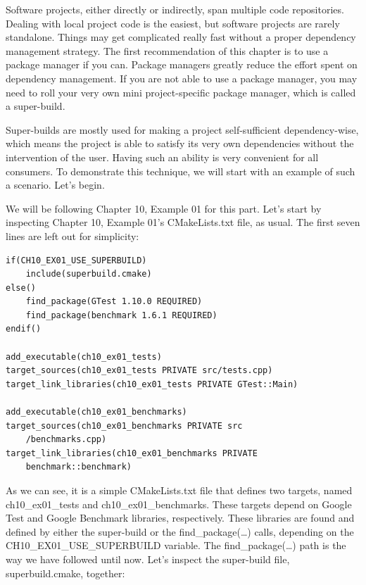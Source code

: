 
Software projects, either directly or indirectly, span multiple code repositories. Dealing with local project code is the easiest, but software projects are rarely standalone. Things may get complicated really fast without a proper dependency management strategy. The first recommendation of this chapter is to use a package manager if you can. Package managers greatly reduce the effort spent on dependency management. If you are not able to use a package manager, you may need to roll your very own mini project-specific package manager, which is called a super-build.

Super-builds are mostly used for making a project self-sufficient dependency-wise, which means the project is able to satisfy its very own dependencies without the intervention of the user. Having such an ability is very convenient for all consumers. To demonstrate this technique, we will start with an example of such a scenario. Let's begin.



We will be following Chapter 10, Example 01 for this part. Let's start by inspecting Chapter 10, Example 01's CMakeLists.txt file, as usual. The first seven lines are left out for simplicity:

\begin{lstlisting}[style=styleCMake]
if(CH10_EX01_USE_SUPERBUILD)
	include(superbuild.cmake)
else()
	find_package(GTest 1.10.0 REQUIRED)
	find_package(benchmark 1.6.1 REQUIRED)
endif()

add_executable(ch10_ex01_tests)
target_sources(ch10_ex01_tests PRIVATE src/tests.cpp)
target_link_libraries(ch10_ex01_tests PRIVATE GTest::Main)

add_executable(ch10_ex01_benchmarks)
target_sources(ch10_ex01_benchmarks PRIVATE src
	/benchmarks.cpp)
target_link_libraries(ch10_ex01_benchmarks PRIVATE
	benchmark::benchmark)
\end{lstlisting}

As we can see, it is a simple CMakeLists.txt file that defines two targets, named ch10\_ex01\_tests and ch10\_ex01\_benchmarks. These targets depend on Google Test and Google Benchmark libraries, respectively. These libraries are found and defined by either the super-build or the find\_package(…) calls, depending on the CH10\_EX01\_USE\_SUPERBUILD variable. The find\_package(…) path is the way we have followed until now. Let's inspect the super-build file, superbuild.cmake, together:

